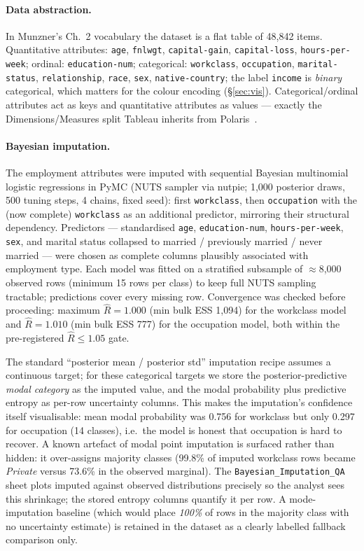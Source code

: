 \documentclass[11pt,a4paper]{article}
\begin{document}
\paragraph{Data abstraction.}
In Munzner's Ch.~2 vocabulary the dataset is a flat table of 48{,}842 items.
Quantitative attributes: \texttt{age}, \texttt{fnlwgt},
\texttt{capital-gain}, \texttt{capital-loss}, \texttt{hours-per-week};
ordinal: \texttt{education-num}; categorical: \texttt{workclass},
\texttt{occupation}, \texttt{marital-status}, \texttt{relationship},
\texttt{race}, \texttt{sex}, \texttt{native-country}; the label
\texttt{income} is \emph{binary} categorical, which matters for the colour
encoding (\S\ref{sec:vis}). Categorical/ordinal attributes act as keys and
quantitative attributes as values --- exactly the Dimensions/Measures split
Tableau inherits from Polaris~\cite[p.~40]{munzner}.

\paragraph{Bayesian imputation.}
The employment attributes were imputed with sequential Bayesian multinomial
logistic regressions in PyMC (NUTS sampler via nutpie; 1{,}000 posterior
draws, 500 tuning steps, 4 chains, fixed seed): first \texttt{workclass},
then \texttt{occupation} with the (now complete) \texttt{workclass} as an
additional predictor, mirroring their structural dependency. Predictors ---
standardised \texttt{age}, \texttt{education-num},
\texttt{hours-per-week}, \texttt{sex}, and marital status collapsed to
married / previously married / never married --- were chosen as complete
columns plausibly associated with employment type. Each model was fitted on
a stratified subsample of $\approx$8{,}000 observed rows (minimum 15 rows
per class) to keep full NUTS sampling tractable; predictions cover every
missing row. Convergence was checked before proceeding: maximum
$\hat{R}=1.000$ (min bulk ESS 1{,}094) for the workclass model and
$\hat{R}=1.010$ (min bulk ESS 777) for the occupation model, both within
the pre-registered $\hat{R} \leq 1.05$ gate.

The standard ``posterior mean / posterior std'' imputation recipe assumes a
continuous target; for these categorical targets we store the
posterior-predictive \emph{modal category} as the imputed value, and the
modal probability plus predictive entropy as per-row uncertainty columns.
This makes the imputation's confidence itself visualisable: mean modal
probability was 0.756 for workclass but only 0.297 for occupation (14
classes), i.e.\ the model is honest that occupation is hard to recover.
A known artefact of modal point imputation is surfaced rather than hidden:
it over-assigns majority classes (99.8\% of imputed workclass rows became
\textit{Private} versus 73.6\% in the observed marginal). The
\texttt{Bayesian\_Imputation\_QA} sheet plots imputed against observed
distributions precisely so the analyst sees this shrinkage; the stored
entropy columns quantify it per row. A mode-imputation baseline (which
would place \emph{100\%} of rows in the majority class with no uncertainty
estimate) is retained in the dataset as a clearly labelled fallback
comparison only.
\end{document}
